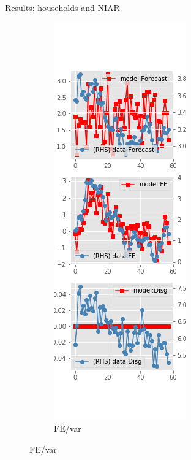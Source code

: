 \documentclass{beamer}
\begin{document}
\begin{frame}{Results: households and NIAR}
\begin{figure}[ht]
\begin{subfigure}[b]{0.19\textwidth}
		\end{subfigure}
		\hfill
		\begin{subfigure}[b]{0.19\textwidth}
			\caption{FE/var}
			\includegraphics[width=\textwidth, height = 0.8\textheight]{figuresDraft/sce_ni_est_diag3.png}

\end{subfigure}
\end{figure}
\end{frame}
\end{document}
